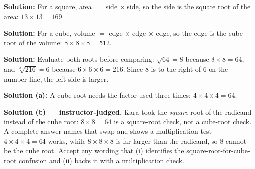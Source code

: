 \documentclass[12pt]{article}
\begin{document}

\textbf{Solution:} \quad For a square, area $=$ side $\times$ side, so the side is the
square root of the area: $13 \times 13 = 169$. 


\textbf{Solution:} \quad For a cube, volume $=$ edge $\times$ edge $\times$ edge, so the
edge is the cube root of the volume: $8 \times 8 \times 8 = 512$. 


\textbf{Solution:} \quad Evaluate both roots before comparing: $\sqrt{64} = 8$ because
$8 \times 8 = 64$, and $\sqrt[3]{216} = 6$ because $6 \times 6 \times 6 = 216$. Since
$8$ is to the right of $6$ on the number line, the left side is larger. \ans{>}


\textbf{Solution (a):} \quad A cube root needs the factor used three times:
$4 \times 4 \times 4 = 64$. 

\textbf{Solution (b) --- instructor-judged.} \quad Kara took the \emph{square} root of
the radicand instead of the cube root: $8 \times 8 = 64$ is a square-root check, not a
cube-root check. A complete answer names that swap and shows a multiplication test ---
$4 \times 4 \times 4 = 64$ works, while $8 \times 8 \times 8$ is far larger than the
radicand, so $8$ cannot be the cube root. Accept any wording that (i) identifies the
square-root-for-cube-root confusion and (ii) backs it with a multiplication check.
\end{document}
